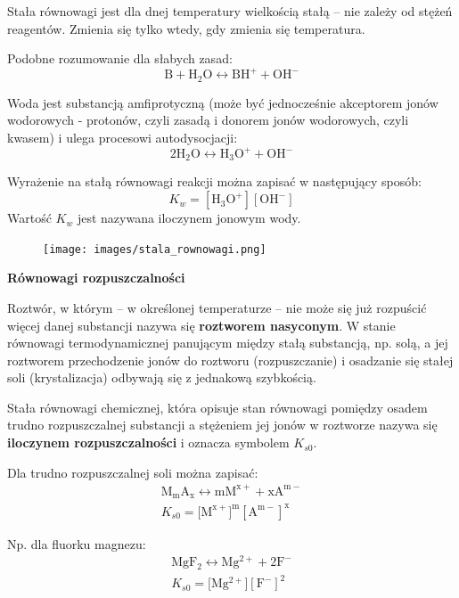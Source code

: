 \documentclass{article}
\begin{document}
Stała równowagi jest dla dnej temperatury wielkością stałą -- nie zależy od stężeń reagentów. Zmienia się tylko wtedy, gdy zmienia się temperatura.

Podobne rozumowanie dla słabych zasad:
\begin{equation*}
    \mathrm{B}+\mathrm{H_2O} \longleftrightarrow \mathrm{BH^+}+\mathrm{OH^-}
\end{equation*}

Woda jest substancją amfiprotyczną (może być jednocześnie akceptorem jonów wodorowych - protonów, czyli zasadą i donorem jonów wodorowych, czyli kwasem) i ulega procesowi autodysocjacji:
\begin{equation*}
    2\mathrm{H_2O} \longleftrightarrow \mathrm{H_3O^+}+\mathrm{OH^-}
\end{equation*}

Wyrażenie na stałą równowagi reakcji można zapisać w następujący sposób:
\begin{equation*}
    K_w=[\mathrm{H_3O^+}][\text{OH}^-]
\end{equation*}
Wartość $K_w$ jest nazywana iloczynem jonowym wody.

\begin{figure}[H]
    \centering
    \texttt{[image: images/stala\_rownowagi.png]}
\end{figure}

\textbf{Równowagi rozpuszczalności}

Roztwór, w którym -- w określonej temperaturze -- nie może się już rozpuścić więcej danej substancji nazywa się \textbf{roztworem nasyconym}. W stanie równowagi termodynamicznej panującym między stałą substancją, np. solą, a jej roztworem przechodzenie jonów do roztworu (rozpuszczanie) i osadzanie się stałej soli (krystalizacja) odbywają się z jednakową szybkością.

Stała równowagi chemicznej, która opisuje stan równowagi pomiędzy osadem trudno rozpuszczalnej substancji a stężeniem jej jonów w roztworze nazywa się \textbf{iloczynem rozpuszczalności} i oznacza symbolem $K_{s0}$.

Dla trudno rozpuszczalnej soli można zapisać:
\begin{gather*}
    \mathrm{M_mA_x}\longleftrightarrow \mathrm{mM^{x+}} + \mathrm{xA^{m-}}\\
    K_{s0}=[\mathrm{M^{x+}]^m}\mathrm{[A^{m-}]^x}
\end{gather*}

Np. dla fluorku magnezu:
\begin{gather*}
    \mathrm{MgF_2}\longleftrightarrow \mathrm{Mg^{2+}} + \mathrm{2F^{-}}\\
    K_{s0}=[\mathrm{Mg^{2+}]}\mathrm{[F^{-}]^2}
\end{gather*}
\end{document}
